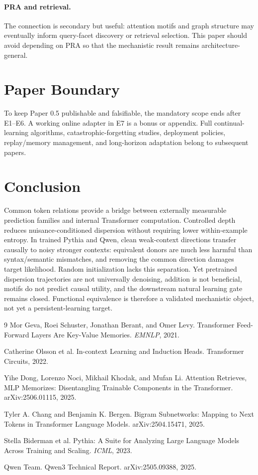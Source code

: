 \documentclass[10pt]{article}
\begin{document}
\paragraph{PRA and retrieval.}
The connection is secondary but useful: attention motifs and graph structure may eventually inform query-facet discovery or retrieval selection. This paper should avoid depending on PRA so that the mechanistic result remains architecture-general.

\section{Paper Boundary}
To keep Paper 0.5 publishable and falsifiable, the mandatory scope ends after E1--E6. A working online adapter in E7 is a bonus or appendix. Full continual-learning algorithms, catastrophic-forgetting studies, deployment policies, replay/memory management, and long-horizon adaptation belong to subsequent papers.

\section{Conclusion}
Common token relations provide a bridge between externally measurable prediction families and internal Transformer computation. Controlled depth reduces nuisance-conditioned dispersion without requiring lower within-example entropy. In trained Pythia and Qwen, clean weak-context directions transfer causally to noisy stronger contexts: equivalent donors are much less harmful than syntax/semantic mismatches, and removing the common direction damages target likelihood. Random initialization lacks this separation. Yet pretrained dispersion trajectories are not universally denoising, addition is not beneficial, motifs do not predict causal utility, and the downstream natural learning gate remains closed. Functional equivalence is therefore a validated mechanistic object, not yet a persistent-learning target.

\begin{thebibliography}{9}
Mor Geva, Roei Schuster, Jonathan Berant, and Omer Levy.
\newblock Transformer Feed-Forward Layers Are Key-Value Memories.
\newblock \emph{EMNLP}, 2021.

Catherine Olsson et al.
\newblock In-context Learning and Induction Heads.
\newblock Transformer Circuits, 2022.

Yihe Dong, Lorenzo Noci, Mikhail Khodak, and Mufan Li.
\newblock Attention Retrieves, MLP Memorizes: Disentangling Trainable Components in the Transformer.
\newblock arXiv:2506.01115, 2025.

Tyler A. Chang and Benjamin K. Bergen.
\newblock Bigram Subnetworks: Mapping to Next Tokens in Transformer Language Models.
\newblock arXiv:2504.15471, 2025.

Stella Biderman et al.
\newblock Pythia: A Suite for Analyzing Large Language Models Across Training and Scaling.
\newblock \emph{ICML}, 2023.

Qwen Team.
\newblock Qwen3 Technical Report.
\newblock arXiv:2505.09388, 2025.
\end{thebibliography}
\end{document}
